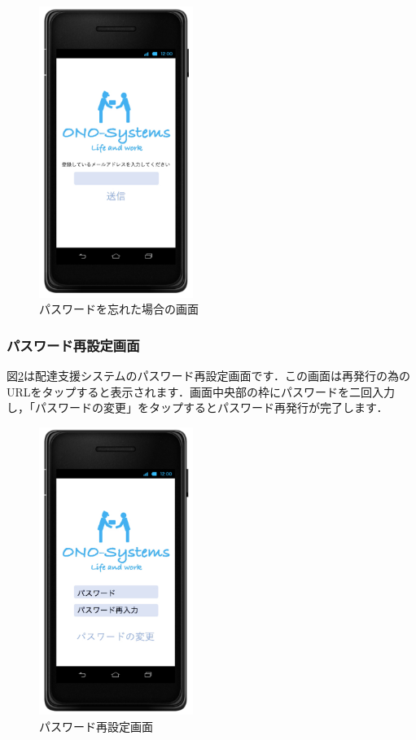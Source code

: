 \documentclass[a4j,titlepage]{jarticle}
\begin{document}
\begin{figure}[htbp]
 \begin{center}
  \includegraphics[width=50mm]{ps_lost}
	\caption{パスワードを忘れた場合の画面}
	\label{fig:ps_lost}
 \end{center}

\end{figure}

\subsubsection{パスワード再設定画面}
図\ref{fig:ps_change}は配達支援システムのパスワード再設定画面です．この画面は再発行の為のURLをタップすると表示されます．画面中央部の枠にパスワードを二回入力し，「パスワードの変更」をタップするとパスワード再発行が完了します．

\begin{figure}[htbp]
 \begin{center}
  \includegraphics[width=50mm]{ps_change}
	\caption{パスワード再設定画面}
	\label{fig:ps_change}
 \end{center}

\end{figure}
\end{document}
